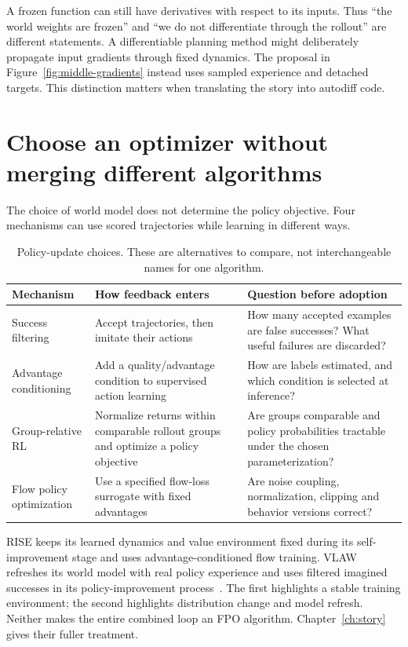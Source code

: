 A frozen function can still have derivatives with respect to its inputs. Thus ``the world weights are frozen'' and ``we do not differentiate through the rollout'' are different statements. A differentiable planning method might deliberately propagate input gradients through fixed dynamics. The proposal in Figure~\ref{fig:middle-gradients} instead uses sampled experience and detached targets. This distinction matters when translating the story into autodiff code.

\section{Choose an optimizer without merging different algorithms}
The choice of world model does not determine the policy objective. Four mechanisms can use scored trajectories while learning in different ways.

\begin{table}[H]\centering\small
\caption{Policy-update choices. These are alternatives to compare, not interchangeable names for one algorithm.}
\begin{tabularx}{\linewidth}{@{}>{\raggedright\arraybackslash}p{28mm}YY@{}}\toprule
Mechanism & How feedback enters & Question before adoption\\\midrule
Success filtering & Accept trajectories, then imitate their actions & How many accepted examples are false successes? What useful failures are discarded?\\
Advantage conditioning & Add a quality/advantage condition to supervised action learning & How are labels estimated, and which condition is selected at inference?\\
Group-relative RL & Normalize returns within comparable rollout groups and optimize a policy objective & Are groups comparable and policy probabilities tractable under the chosen parameterization?\\
Flow policy optimization & Use a specified flow-loss surrogate with fixed advantages & Are noise coupling, normalization, clipping and behavior versions correct?\\\bottomrule
\end{tabularx}
\end{table}

RISE keeps its learned dynamics and value environment fixed during its self-improvement stage and uses advantage-conditioned flow training. VLAW refreshes its world model with real policy experience and uses filtered imagined successes in its policy-improvement process~\citep{rise,vlaw}. The first highlights a stable training environment; the second highlights distribution change and model refresh. Neither makes the entire combined loop an FPO algorithm. Chapter~\ref{ch:story} gives their fuller treatment.

